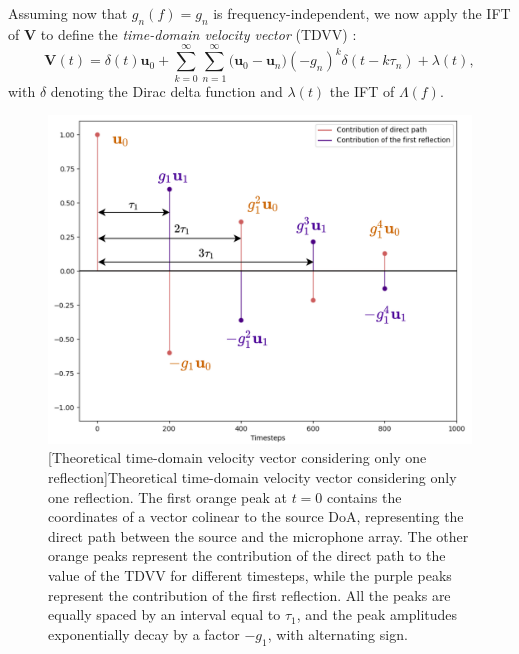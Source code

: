 Assuming now that $g_n(f)=g_n$ is frequency-independent, we now apply the IFT of $\mathbf{V}$ to define the \textit{time-domain velocity vector} (TDVV) :
\begin{equation}
\label{eq:TDVVdefinition}
    \mathbf{V}(t) = \delta(t) \mathbf{u}_0 + \sum_{k=0}^{\infty} \sum_{n=1}^{\infty} \Big(\mathbf{u}_0 - \mathbf{u}_n\Big) (-g_n)^k \delta(t-k \tau_n) + \lambda(t),
\end{equation}
with $\delta$ denoting the Dirac delta function and $\lambda(t)$ the IFT of $\Lambda(f)$.

\begin{figure}[t]
    \begin{center}
    \includegraphics[width=0.8\linewidth]{Images/chap2/tdvv_1reflection_annote.png}
    [Theoretical time-domain velocity vector considering only one reflection]{Theoretical time-domain velocity vector considering only one reflection. The first orange peak at $t=0$ contains the coordinates of a vector colinear to the source DoA, representing the direct path between the source and the microphone array. The other orange peaks represent the contribution of the direct path to the value of the TDVV for different timesteps, while the purple peaks represent the contribution of the first reflection. All the peaks are equally spaced by an interval equal to $\tau_1$, and the peak amplitudes exponentially decay by a factor $-g_1$, with alternating sign.}
    \label{fig:TDVV_oneReflection}
    \end{center}
\end{figure}


